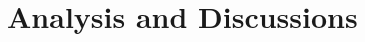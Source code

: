 \documentclass{article} \usepackage{iclr2021_conference,times}
\begin{document}
\begin{comment}
\begin{table*}[t]
	\small
	\centering
	\caption{Comparison of searched CNN in the standard space on three different datasets and report the \textbf{lowest error rate} of 3 found architectures retrained from scratch. $^\dagger$: Training setup follows SDARTS \citep{chen2020stabilizing} where all models have 20 cells and 36 initial channels. $^\ddagger$: Training setup follows R-DARTS \citep{zela2020understanding}.}\smallskip
	\smallskip\begin{tabular}{c*{12}{|c}}
		\hline
		\multicolumn{2}{c|}{\textbf{Benchmark}} &  \textbf{RS-ws}  &  \textbf{DARTS}  &  \textbf{PC-DARTS}  &  \textbf{R-DARTS(DP)}  &  \textbf{R-DARTS(L2)}  &  \textbf{DARTS-ES}  &  \textbf{DARTS-ADA}  &  \textbf{SDARTS-RS}  &  \textbf{SDARTS-ADV}  &  \textbf{Ours}$^\dagger$  &  \textbf{Ours}$^{\ddagger}$\\
		\hline
		\multirow{2}*{C10}  &  S2 &  3.66 &  4.85 &  3.02 &  3.48 &  3.31 &  3.26 &  3.35 &  2.75 &  2.65 &  \textbf{2.63}  &  \textbf{2.63} \\\cline{2-13}
		~     &  S3 &  2.95 &  3.34 &  2.51 &  2.93 &  2.51 &  2.74 &  2.59 &  2.53 &  \textbf{2.49} & 2.50  &  2.50 \\\hline
		\multirow{2}*{C100}  &  S2 &  21.21 &  26.05 &  18.23 &  22.30 &  22.24 &  23.25 &  23.52 &  17.56 &  17.24 &  \textbf{17.10}  &  \textbf{22.15}\\\cline{2-13}
		~     &  S3 &  23.75 &  28.90 &  18.05 &  22.36 &  23.99 &  23.73 &  23.37 &  17.73 &  17.12 &  \textbf{15.86} &  \textbf{21.13}\\\hline
		\multirow{2}*{SVHN}  &  S2 &  2.72 &  3.53 &  2.39 &  2.52 &  2.51 &  2.60 &  2.54 &  2.37 &  \textbf{2.07} & 2.12 &  2.57\\ \cline{2-13}
		~    &  S3 &  2.87 &  3.41 &  2.27 &  2.49 &  2.48 &  2.50 &  2.50 &  2.21 &  \textbf{2.05} &  2.21 &  2.69\\\hline\end{tabular}
	\label{tab:comparison-rdarts-s2-s3-best}
\end{table*}
\end{comment}

\section{Analysis and Discussions}
\end{document}
